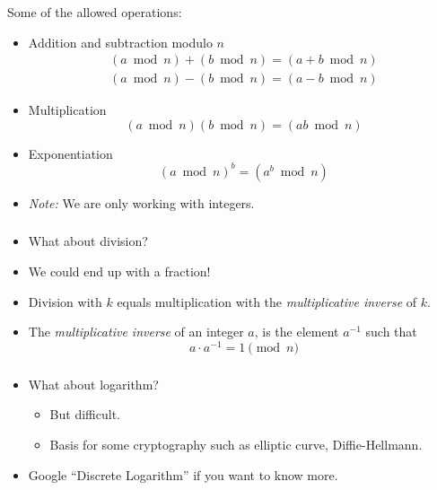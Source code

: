 \documentclass[10pt]{beamer}
\newcommand{\bi}{\begin{itemize}}
\newcommand{\ei}{\end{itemize}}
\begin{document}
\begin{frame}
  \frametitle{\insertsubsection}
  \vspace{20pt}
  Some of the allowed operations:
  \bi
    \item Addition and subtraction modulo $n$
      \begin{align*}
        (a \bmod n) + (b \bmod n) = (a + b \bmod n) \\
        (a \bmod n) - (b \bmod n) = (a - b \bmod n)
      \end{align*}
    \item Multiplication
      \[
        (a \bmod n)(b \bmod n) = (ab \bmod n)
      \]
    \item Exponentiation
      \[
        (a \bmod n)^b = (a^b \bmod n)
      \]
    \item \emph{Note:} We are only working with integers.
  \ei
\end{frame}

\begin{frame}
  \frametitle{\insertsubsection}
  \vspace{30pt}
  \bi
    \item What about division? 
    \item We could end up with a fraction!
    \item Division with $k$ equals multiplication with the \emph{multiplicative
      inverse} of $k$.
    \item The \emph{multiplicative inverse} of an integer $a$, is the element $a^{-1}$ such that
      \[
        a \cdot a^{-1} = 1 \pmod{n}
      \]
  \ei
\end{frame}

\begin{frame}
  \frametitle{\insertsubsection}
  \vspace{30pt}
  \bi
    \item What about logarithm? 
      \bi
        \item But difficult.
        \item Basis for some cryptography such as elliptic curve, Diffie-Hellmann.
      \ei
    \item Google ``Discrete Logarithm'' if you want to know more.
  \ei
\end{frame}
\end{document}
